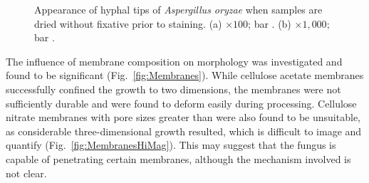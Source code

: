 \begin{figure}[tb]
	\centering
	\hspace{0.5cm}
	\caption{Appearance of hyphal tips of \emph{Aspergillus oryzae} when samples are dried without fixative prior to staining. (a) $\times 100$; bar . (b) $\times 1,000$; bar .}
	\label{fig:BurstTips}
\end{figure}

The influence of membrane composition on morphology was investigated and found to be significant (Fig.~\ref{fig:Membranes}). While cellulose acetate membranes successfully confined the growth to two dimensions, the membranes were not sufficiently durable and were found to deform easily during processing. Cellulose nitrate membranes with pore sizes greater than  were also found to be unsuitable, as considerable three-dimensional growth resulted, which is difficult to image and quantify (Fig.~\ref{fig:MembranesHiMag}). This may suggest that the fungus is capable of penetrating certain membranes, although the mechanism involved is not clear.

